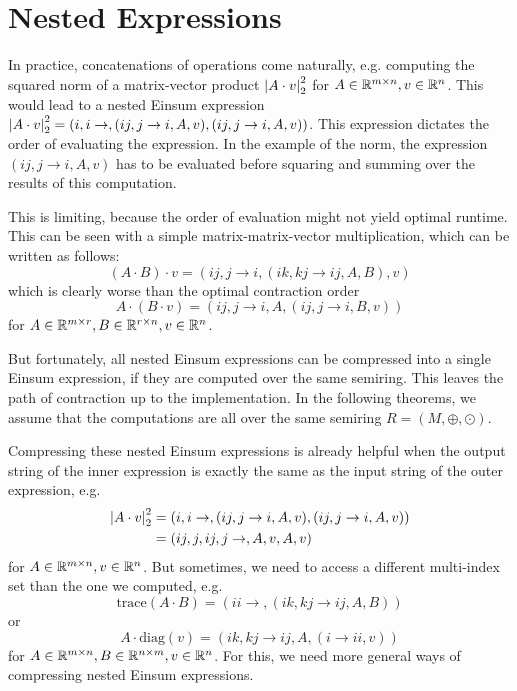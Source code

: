 \chapter{Nested Expressions}

In practice, concatenations of operations come naturally, e.g. computing the squared norm of a matrix-vector product $\left| A \cdot v \right|_2^2$
for $A \in \mathbb{R}^{m \times n}, v \in \mathbb{R}^n$.
This would lead to a nested Einsum expression $\left| A \cdot v \right|_2^2 = (i,i \rightarrow , (ij, j \rightarrow i, A, v), (ij, j \rightarrow i, A, v))$.
This expression dictates the order of evaluating the expression.
In the example of the norm, the expression $(ij, j \rightarrow i, A, v)$ has to be evaluated before squaring and summing over the results of this computation.

This is limiting, because the order of evaluation might not yield optimal runtime.
This can be seen with a simple matrix-matrix-vector multiplication, which can be written as follows:
$$(A \cdot B) \cdot v = (ij, j \rightarrow i, (ik, kj \rightarrow ij, A, B), v)$$
which is clearly worse than the optimal contraction order
$$A \cdot (B \cdot v) = (ij, j \rightarrow i, A, (ij, j \rightarrow i, B, v))$$
for $A \in \mathbb{R}^{m \times r}, B \in \mathbb{R}^{r \times n}, v \in \mathbb{R}^n$.

But fortunately, all nested Einsum expressions can be compressed into a single Einsum expression, if they are computed over the same semiring.
This leaves the path of contraction up to the implementation.
In the following theorems, we assume that the computations are all over the same semiring $R = (M, \oplus, \odot)$.



Compressing these nested Einsum expressions is already helpful when the output string of the inner expression is exactly the same as the input string of the outer expression,
e.g.
\begin{align*}
    \left| A \cdot v \right|_2^2 & = (i,i\rightarrow,(ij, j \rightarrow i, A, v),(ij, j \rightarrow i, A, v)) \\
                        & = (ij,j,ij,j\rightarrow,A,v,A,v)
\end{align*}
for $A \in \mathbb{R}^{m \times n}, v \in \mathbb{R}^{n}$.
But sometimes, we need to access a different multi-index set than the one we computed, e.g.
$$\text{trace}(A \cdot B) = (ii \rightarrow, (ik, kj \rightarrow ij, A, B))$$
or
$$A \cdot \text{diag}(v) = (ik, kj \rightarrow ij, A, (i \rightarrow ii, v))$$
for $A \in \mathbb{R}^{m \times n}, B \in \mathbb{R}^{n \times m}, v \in \mathbb{R}^{n}$.
For this, we need more general ways of compressing nested Einsum expressions.

